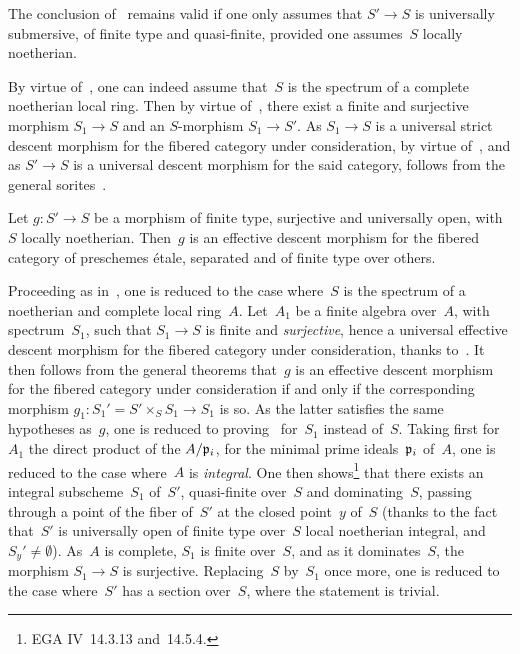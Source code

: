 \begin{corollary}
\label{IX.4.8}
The conclusion of~ remains valid if one only assumes that
$S'\to S$ is universally submersive, of finite type and quasi-finite,
provided one assumes~$S$ locally noetherian.
\end{corollary}

By
virtue of~, one can indeed assume that~$S$ is the
spectrum of a complete noetherian local ring. Then by virtue
of~, there exist a finite and surjective morphism $S_1\to S$
and an $S$-morphism $S_1\to S'$. As $S_1\to S$ is a
universal strict descent morphism for the fibered category
under consideration, by virtue of~, and as $S'\to S$ is a
universal descent morphism for the said category,  follows
from the general sorites~\cite{IX.D}.

\begin{corollary}
\label{IX.4.9}
Let $g\colon S'\to S$ be a morphism of finite type, surjective and
universally open, with~$S$ locally noetherian. Then~$g$
is an effective descent morphism for the fibered
category of preschemes \'etale, separated and of
finite type over others.
\end{corollary}

Proceeding as in~, one is reduced to the case
where~$S$ is the spectrum of a noetherian and
complete local ring~$A$. Let~$A_1$ be a finite algebra over~$A$, with
spectrum~$S_1$, such that $S_1\to S$ is finite and \emph{surjective},
hence a universal effective descent morphism for the
fibered category under consideration, thanks to~.
It then follows from the general theorems \cite{IX.D}
that~$g$ is an effective descent morphism for the fibered
category under consideration if and only if the
corresponding morphism $g_1\colon S_1'=S'\times_S S_1\to S_1$ is so. As the
latter satisfies the same hypotheses as~$g$, one is
reduced to proving~ for~$S_1$ instead of~$S$.
Taking first for~$A_1$ the direct product of the $A/\mathfrak{p}_i$,
for the minimal prime ideals~$\mathfrak{p}_i$ of~$A$, one is
reduced to the case where~$A$ is \emph{integral}. One then
shows\footnote{\Cf EGA IV~14.3.13 and~14.5.4.} that there exists an
integral subscheme~$S_1$ of~$S'$, quasi-finite over~$S$ and
dominating~$S$, passing through a point of the fiber of~$S'$ at the
closed point~$y$ of~$S$ (thanks to the fact that~$S'$ is universally
open of finite type over~$S$ local noetherian integral, and
$S_y'\neq\emptyset$). As~$A$ is complete, $S_1$ is finite over~$S$,
and as it dominates~$S$, the morphism $S_1\to S$ is surjective.
Replacing~$S$ by~$S_1$ once more, one is reduced to the
case where~$S'$ has a section over~$S$, where the statement is
trivial.

